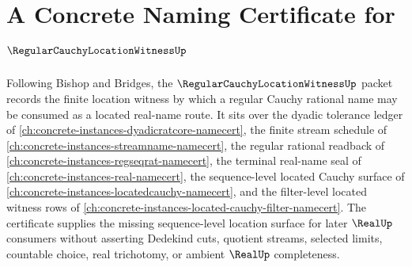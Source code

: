 \chapter{A Concrete Naming Certificate for $\RegularCauchyLocationWitnessUp$}
\label{ch:concrete-instances-regular-cauchy-location-witness-namecert}

Following Bishop and Bridges, the $\RegularCauchyLocationWitnessUp$ packet records the finite location witness by which a regular Cauchy rational name may be consumed as a located real-name route. It sits over the dyadic tolerance ledger of \autoref{ch:concrete-instances-dyadicratcore-namecert}, the finite stream schedule of \autoref{ch:concrete-instances-streamname-namecert}, the regular rational readback of \autoref{ch:concrete-instances-regseqrat-namecert}, the terminal real-name seal of \autoref{ch:concrete-instances-real-namecert}, the sequence-level located Cauchy surface of \autoref{ch:concrete-instances-locatedcauchy-namecert}, and the filter-level located witness rows of \autoref{ch:concrete-instances-located-cauchy-filter-namecert}. The certificate supplies the missing sequence-level location surface for later $\RealUp$ consumers without asserting Dedekind cuts, quotient streams, selected limits, countable choice, real trichotomy, or ambient $\RealUp$ completeness.

